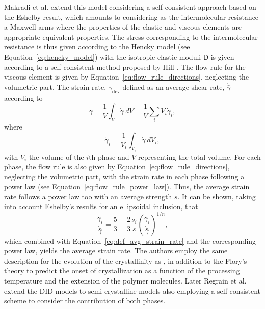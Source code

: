 Makradi et al. \citep{makradiTwophaseSelfconsistentModel2005} extend this model considering a self-consistent approach based on the Eshelby result, which amounts to considering as the intermolecular resistance a Maxwell arms where the properties of the elastic and viscous elements are appropriate equivalent properties.
The stress corresponding to the intermolecular resistance is thus given according to the Hencky model (see Equation~\eqref{eq:hencky_model}) with the isotropic elastic moduli $\bm{\mathsf D}$ is given according to a self-consistent method proposed by Hill \citep{hillSelfconsistentMechanicsComposite1965}.
The flow rule for the viscous element is given by Equation~\eqref{eq:flow_rule_directions}, neglecting the volumetric part.
The strain rate, $\dot \gamma_\text{dev}$ defined as an average shear rate, $\dot{\bar\gamma}$ according to
\begin{equation}
	\label{eq:def_avg_strain_rate}
	\dot{\bar\gamma} = \frac{1}{V}\int_V \dot \gamma\ dV = \frac{1}{V}\sum_i V_i \dot{\gamma}_i,
\end{equation}
where
\begin{equation}
	\dot \gamma_i = \frac{1}{V_i}\int_{V_i} \dot \gamma\ dV_i,
\end{equation}
with $V_i$ the volume of the $i$th phase and $V$ representing the total volume.
For each phase, the flow rule is also given by Equation~\eqref{eq:flow_rule_directions}, neglecting the volumetric part, with the strain rate in each phase following a power law (see Equation~\eqref{eq:flow_rule_power_law}).
Thus, the average strain rate follows a power law too with an average strength $\bar s$.
It can be shown, taking into account Eshelby's results for an ellipsoidal inclusion, that
\begin{equation}
	\frac{\dot \gamma_i}{\dot{\bar \gamma}} = \frac{5}{3} - \frac{2}{3}\frac{s_i}{\bar s} \left(\frac{\dot \gamma_i}{\dot{\bar \gamma}}\right)^{1/n},
\end{equation}
which combined with Equation~\eqref{eq:def_avg_strain_rate} and the corresponding power law, yields the average strain rate.
The authors employ the same description for the evolution of the crystallinity as \cite{ahziModelingDeformationBehavior2003}, in addition to the Flory’s theory to predict the onset of crystallization as a function of the processing temperature and the extension of the polymer molecules.
Later Regrain et al. \citep{regrainMultimechanismModelsSemicrystalline2009} extend the DID models to semi-crystalline models also employing a self-consistent scheme to consider the contribution of both phases.

